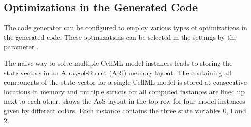 \subsection{Optimizations in the Generated Code}\label{sec:optimizations_in_the_generated}

The code generator can be configured to employ various types of optimizations in the generated code. These optimizations can be selected in the settings by the parameter .

The naive way to solve multiple CellML model instances leads to storing the state vectors
in an Array-of-Struct (AoS) memory layout. The  containing all components of the state vector for a single CellML model is stored at consecutive locations in memory and multiple structs for all computed instances are lined up next to each other.  shows the AoS layout in the top row for four model instances given by different colors. Each instance contains the three state variables $0,1$ and $2$. 

